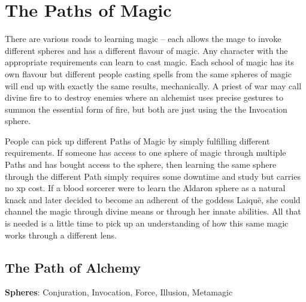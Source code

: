 \chapter{The Paths of Magic}
\label{magic_paths}

\begin{multicols}{2}

There are various roads to learning magic -- each allows the mage to invoke different spheres and has a different flavour of magic.
Any character with the appropriate requirements can learn to cast magic.
Each school of magic has its own flavour but different people casting spells from the same spheres of magic will end up with exactly the same results, mechanically.
A priest of war may call divine fire to to destroy enemies where an alchemist uses precise gestures to summon the essential form of fire, but both are just using the the Invocation sphere.

People can pick up different Paths of Magic by simply fulfilling different requirements. If someone has access to one sphere of magic through multiple Paths and has bought access to the sphere, then learning the same sphere through the different Path simply requires some \gls{downtime} and study but carries no \gls{xp} cost. If a blood sorcerer were to learn the Aldaron sphere as a natural knack and later decided to become an adherent of the goddess Laiqu\"{e}, she could channel the magic through divine means or through her innate abilities.
All that is needed is a little time to pick up an understanding of how this same magic works through a different lens.

\end{multicols}

\section{The Path of Alchemy}

\noindent\textbf{Spheres}: Conjuration, Invocation, Force, Illusion, Metamagic

